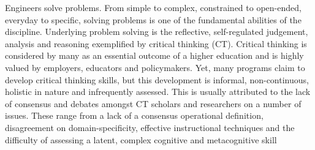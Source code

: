 Engineers solve problems.  From simple to complex, constrained to open-ended, everyday to specific, solving problems is one of the fundamental abilities of the discipline.  Underlying problem solving is the reflective, self-regulated judgement, analysis and reasoning exemplified by critical thinking (CT).  Critical thinking is considered by many as an essential outcome of a higher education and is highly valued by employers, educators and policymakers.  Yet, many  programs claim to develop critical thinking skills, but this development is informal, non-continuous, holistic in nature and infrequently assessed\cite{Paul:1997ti, Ahern:2012ey}.  This is usually attributed to the lack of consensus and debates amongst CT scholars and researchers on a number of issues.  These range from a lack of a consensus operational definition, disagreement on domain-specificity\cite{Ennis:1989bm, McPeck:1990is}, effective instructional techniques\cite{Tsui:2002cc} and the difficulty of assessing a latent, complex cognitive and metacognitive skill\cite{Ennis:1993us, Halpern:2003tt}
 

